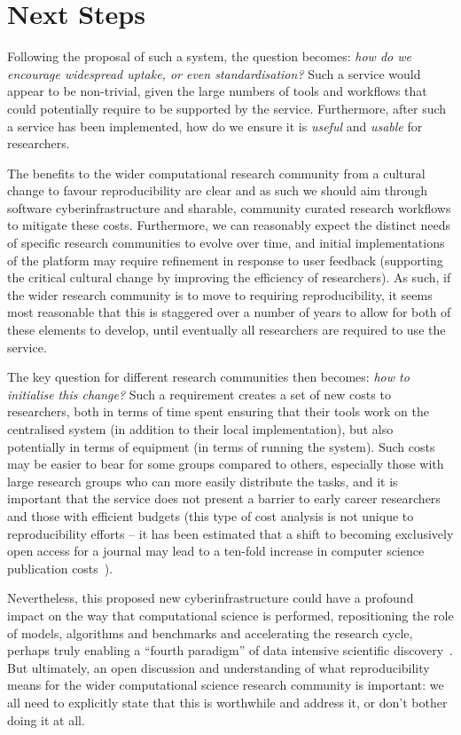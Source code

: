 \documentclass[a4paper,11pt]{article}
\begin{document}
\section{Next Steps}

Following the proposal of such a system, the question becomes:
{\emph{how do we encourage widespread uptake, or even
standardisation?}}  Such a service would appear to be non-trivial,
given the large numbers of tools and workflows that could potentially
require to be supported by the service. Furthermore, after such a
service has been implemented, how do we ensure it is \emph{useful} and
\emph{usable} for researchers.

The benefits to the wider computational research community from a
cultural change to favour reproducibility are clear and as such we
should aim through software cyberinfrastructure and sharable,
community curated research workflows to mitigate these
costs. Furthermore, we can reasonably expect the distinct needs of
specific research communities to evolve over time, and initial
implementations of the platform may require refinement in response to
user feedback (supporting the critical cultural change by improving
the efficiency of researchers). As such, if the wider research
community is to move to requiring reproducibility, it seems most
reasonable that this is staggered over a number of years to allow for
both of these elements to develop, until eventually all researchers
are required to use the service.

The key question for different research communities then becomes:
{\emph{how to initialise this change?}} Such a requirement creates a
set of new costs to researchers, both in terms of time spent ensuring
that their tools work on the centralised system (in addition to their
local implementation), but also potentially in terms of equipment (in
terms of running the system). Such costs may be easier to bear for
some groups compared to others, especially those with large research
groups who can more easily distribute the tasks, and it is important
that the service does not present a barrier to early career
researchers and those with efficient budgets (this type of cost
analysis is not unique to reproducibility efforts -- it has been
estimated that a shift to becoming exclusively open access for a
journal may lead to a ten-fold increase in computer science
publication costs~\cite{vardi-cacm-2014}).

Nevertheless, this proposed new cyberinfrastructure could have a
profound impact on the way that computational science is performed,
repositioning the role of models, algorithms and benchmarks and
accelerating the research cycle, perhaps truly enabling a ``fourth
paradigm'' of data intensive scientific discovery~\cite{hey:2009}. But
ultimately, an open discussion and understanding of what
reproducibility means for the wider computational science research
community is important: we all need to explicitly state that this is
worthwhile and address it, or don't bother doing it at all.




\end{document}
